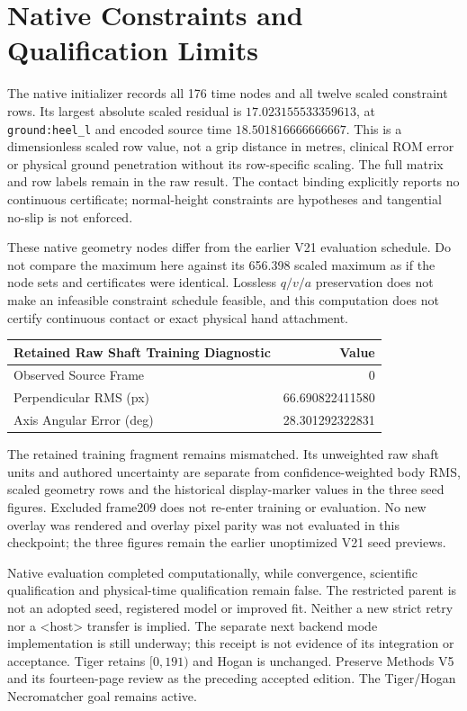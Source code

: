 \documentclass[11pt]{article}
\begin{document}
\newpage
\section*{Native Constraints and Qualification Limits}
The native initializer records all 176 time nodes and all twelve scaled
constraint rows. Its largest absolute scaled residual is
$17.023155533359613$, at \texttt{ground:heel\_l} and encoded source time
$18.501816666666667$. This is a dimensionless scaled row value, not a grip
distance in metres, clinical ROM error or physical ground penetration without
its row-specific scaling. The full matrix and row labels remain in the raw
result. The contact binding explicitly reports no continuous certificate;
normal-height constraints are hypotheses and tangential no-slip is not
enforced.

These native geometry nodes differ from the earlier V21 evaluation schedule.
Do not compare the maximum here against its 656.398 scaled maximum as if the
node sets and certificates were identical. Lossless $q/v/a$ preservation does
not make an infeasible constraint schedule feasible, and this computation does
not certify continuous contact or exact physical hand attachment.

\begin{center}\begin{tabular}{lr}\toprule
Retained Raw Shaft Training Diagnostic & Value\\\midrule
Observed Source Frame & 0\\
Perpendicular RMS (px) & 66.690822411580\\
Axis Angular Error (deg) & 28.301292322831\\\bottomrule
\end{tabular}\end{center}
The retained training fragment remains mismatched. Its unweighted raw shaft
units and authored uncertainty are separate from confidence-weighted body RMS,
scaled geometry rows and the historical display-marker values in the three
seed figures. Excluded frame209 does not re-enter training or evaluation.
No new overlay was rendered and overlay pixel parity was not evaluated in this
checkpoint; the three figures remain the earlier unoptimized V21 seed previews.

Native evaluation completed computationally, while convergence, scientific
qualification and physical-time qualification remain false. The restricted
parent is not an adopted seed, registered model or improved fit. Neither a new
strict retry nor a <host> transfer is implied. The separate next backend
mode implementation is still underway; this receipt is not evidence of its
integration or acceptance. Tiger retains $[0,191)$ and Hogan is unchanged.
Preserve Methods V5 and its fourteen-page review as the preceding accepted
edition. The Tiger/Hogan Necromatcher goal remains active.
\end{document}

